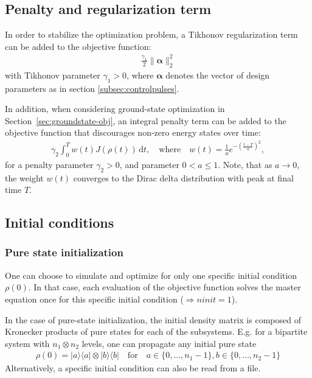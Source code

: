 \documentclass[11pt]{article}
\begin{document}
\subsection{Penalty and regularization term}
In order to stabilize the optimization problem, a Tikhonov regularization term can be added to the objective function:
\begin{align}
 \frac{\gamma_1}{2} \| \boldsymbol{\alpha} \|^2_2
\end{align}
with Tikhonov parameter $\gamma_1 > 0$, where $\boldsymbol{\alpha}$ denotes the vector of design parameters as in section \ref{subsec:controlpulses}.


In addition, when considering ground-state optimization in
Section~\ref{sec:groundstate-obj}, an integral penalty term can be added to the objective function that discourages non-zero energy states over time:
\begin{align}
  \gamma_2 \int_0^T w(t) J\left(\rho(t)\right) \, \mathrm{d}t, \quad \text{where} \quad w(t) =
  \frac{1}{a} e^{ -\left(\frac{t-T}{a} \right)^2},
\end{align}
for a penalty parameter $\gamma_2 > 0$, and parameter $0 < a \leq 1$. 
Note, that as $a\to 0$, the weight $w(t)$ converges to the Dirac delta
distribution with peak at final time $T$. 



\subsection{Initial conditions}\label{subsec:initcond}

\subsubsection{Pure state initialization}
One can choose to simulate and optimize for only one specific initial condition $\rho(0)$. In that case, each evaluation of the objective function solves the master equation once for this specific initial condition ($\Rightarrow ninit = 1$). 

In the case of pure-state initialization, the initial density matrix is composed
of Kronecker products of pure states for each of the subsystems. E.g. for a bipartite system with $n_1
\otimes n_2$ levels, one can propagate any initial pure state 
\begin{align}
  \rho(0)  = |a\rangle \langle a| \otimes |b\rangle \langle b| \quad \text{for} \quad a \in \{0,\dots, n_1-1\}, b\in \{0,\dots, n_2-1\}
\end{align}
Alternatively, a specific initial condition can also be read from a file. 
\end{document}
